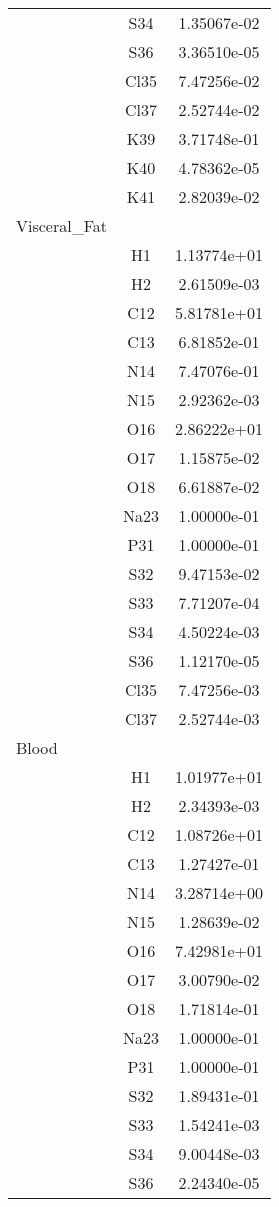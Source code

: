 \begin{centering}
\begin{longtable}{l c c}
& S34 & 1.35067e-02 \\ 
& S36 & 3.36510e-05 \\ 
& Cl35 & 7.47256e-02 \\ 
& Cl37 & 2.52744e-02 \\ 
& K39 & 3.71748e-01 \\ 
& K40 & 4.78362e-05 \\ 
& K41 & 2.82039e-02 \\ 
\hline
Visceral\_Fat & & \\
\hline
& H1 & 1.13774e+01 \\ 
& H2 & 2.61509e-03 \\ 
& C12 & 5.81781e+01 \\ 
& C13 & 6.81852e-01 \\ 
& N14 & 7.47076e-01 \\ 
& N15 & 2.92362e-03 \\ 
& O16 & 2.86222e+01 \\ 
& O17 & 1.15875e-02 \\ 
& O18 & 6.61887e-02 \\ 
& Na23 & 1.00000e-01 \\ 
& P31 & 1.00000e-01 \\ 
& S32 & 9.47153e-02 \\ 
& S33 & 7.71207e-04 \\ 
& S34 & 4.50224e-03 \\ 
& S36 & 1.12170e-05 \\ 
& Cl35 & 7.47256e-03 \\ 
& Cl37 & 2.52744e-03 \\ 
\hline
Blood & & \\
\hline
& H1 & 1.01977e+01 \\ 
& H2 & 2.34393e-03 \\ 
& C12 & 1.08726e+01 \\ 
& C13 & 1.27427e-01 \\ 
& N14 & 3.28714e+00 \\ 
& N15 & 1.28639e-02 \\ 
& O16 & 7.42981e+01 \\ 
& O17 & 3.00790e-02 \\ 
& O18 & 1.71814e-01 \\ 
& Na23 & 1.00000e-01 \\ 
& P31 & 1.00000e-01 \\ 
& S32 & 1.89431e-01 \\ 
& S33 & 1.54241e-03 \\ 
& S34 & 9.00448e-03 \\ 
& S36 & 2.24340e-05 \\ 

\end{longtable}
\end{centering}
